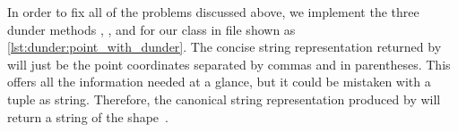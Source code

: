 %
%
%
%
%

In order to fix all of the problems discussed above, we implement the three dunder methods , , and  for our  class in file  shown as \cref{lst:dunder:point_with_dunder}.
The concise string representation returned by  will just be the point coordinates separated by commas and in parentheses.
This offers all the information needed at a glance, but it could be mistaken with a tuple as string.
Therefore, the canonical string representation produced by  will return a string of the shape~.

